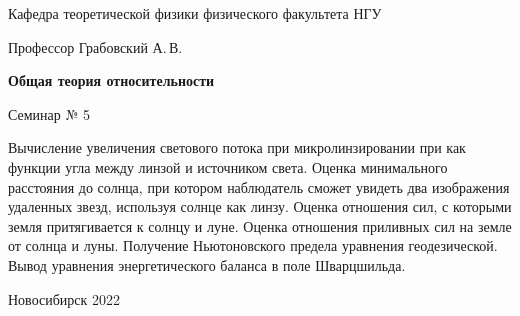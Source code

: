 \documentclass[12pt,pagesize,paper=192mm:108mm,landscape]{scrbook}
\begin{document}
\begin{titlepage}
\begin{center}
    Кафедра теоретической физики физического факультета НГУ
    \medskip

    \Large
    Профессор Грабовский А.\,В.
    \smallskip

    \huge
    \textbf{Общая теория относительности}
    \smallskip

    \Large
    Семинар № 5
    \vfill

    \normalsize
    \begin{minipage}{0.85\linewidth}
      Вычисление увеличения светового потока при микролинзировании при
      как функции угла между линзой и источником света. Оценка
      минимального расстояния до солнца, при котором наблюдатель
      сможет увидеть два изображения удаленных звезд, используя солнце
      как линзу. Оценка отношения сил, с которыми земля притягивается
      к солнцу и луне. Оценка отношения приливных сил на земле от
      солнца и луны. Получение Ньютоновского предела уравнения
      геодезической. Вывод уравнения энергетического баланса в поле
      Шварцшильда.
    \end{minipage}
    \vfill

    \normalsize \ccbysa\hspace{0.5em}  Новосибирск 2022
  \end{center}
\end{titlepage}
\end{document}
